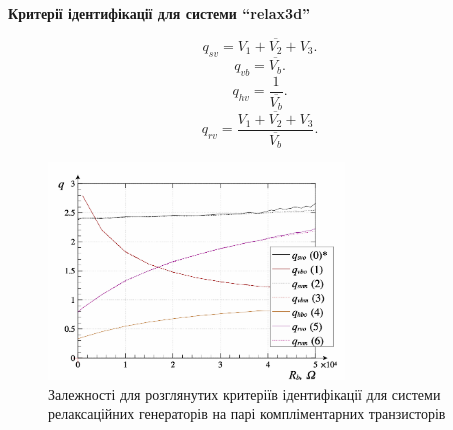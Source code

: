 \documentclass[14pt,handout,utf8]{beamer}
\newcommand{\Xhead}[1]{
 \begin{center}%
      \textbf{#1}%
 \end{center}%
}
\begin{document}

\begin{frame}
  \frametitle{~}

  \Xhead{Критерії ідентифікації для системи ``relax3d''}

\begin{equation}
  q_{sv} = \overline{V_1+V_2+V_3} .
  \label{atu:eq:q_sv_relax}
\end{equation}
%
\begin{equation}
  q_{vb} = \overline{V_b} .
  \label{atu:eq:q_vb_relax}
\end{equation}
%
\begin{equation}
  q_{hv} = \frac{1}{\overline{V_b}} .
  \label{atu:eq:q_hb_relax}
\end{equation}
%
\begin{equation}
  q_{rv} = \frac{\overline{V_1+V_2+V_3}}{\overline{V_b}}.
  \label{atu:eq:q_rv_relax}
\end{equation}

  \begin{figure}
    \includegraphics[width=0.7\textwidth]{../p7/p/relax3d_read_q-p_q1.png}
    \caption{Залежності для розглянутих критеріїв ідентифікації для системи релаксаційних генераторів на парі компліментарних транзисторів}
  \end{figure}


\end{frame}


\end{document}

